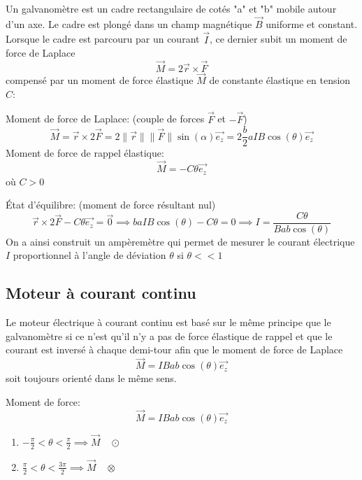 \documentclass[
    11pt,
    a4paper,
    oneside,
    headinlcude, footinclude,
    twoside,
]{report}
\renewcommand{\vec}[1]{\overrightarrow{#1}}
\begin{document}
Un galvanomètre est un cadre rectangulaire de cotés "a" et "b" mobile autour
d'un axe. Le cadre est plongé dans un champ magnétique $\vec B$ uniforme et
constant. Lorsque le cadre est parcouru par un courant $\vec I$, ce dernier
subit un moment de force de Laplace $$\vec M = 2 \vec r \times \vec F$$ 
compensé par un moment de force élastique $\vec M$ de constante élastique en
tension $C$:

\begin{center}
\end{center}

Moment de force de Laplace: (couple de forces $\vec F$ et $-\vec F$)
$$\vec M = \vec r \times 2 \vec F = 2 \| \vec r \| \|\vec F\| \sin(\alpha) \vec{e_{z}}
= 2 \frac{b}{2} a IB \cos(\theta) \vec{e_{z}}$$
Moment de force de rappel élastique:
$$\vec M = - C \theta \vec{e_{z}}$$
où $C > 0$

État d'équilibre: (moment de force résultant nul)
\begin{equation}
    \vec r \times 2 \vec F  - C \theta \vec{e_{z}} = \vec 0 \implies baIB \cos(\theta)
    - C\theta = 0 \implies I = \frac{C \theta}{ Bab \cos(\theta) }
\end{equation}
On a ainsi construit un ampèremètre qui permet de mesurer le courant électrique
$I$ proportionnel à l'angle de déviation $\theta$ si $\theta << 1$

\subsection{Moteur à courant continu}
\label{sub:moteur_a_courant_continu}

Le moteur électrique à courant continu est basé sur le même principe que le
galvanomètre si ce n'est qu'il n'y a pas de force élastique de rappel et que le
courant est inversé à chaque demi-tour afin que le moment de force de Laplace $$\vec M
= IBab \cos(\theta)\vec{e_{z}}$$ soit toujours orienté dans le même sens.


\begin{center}
    \begin{minipage}{.64\linewidth}
    \end{minipage}
    \begin{minipage}{.35\linewidth}
        \setlength{\parskip}{.3em}
        Moment de force:
        $$\vec M = IBab \cos(\theta)\vec{e_{z}}$$

        \begin{enumerate}
            \item $- \frac{\pi}{2} < \theta < \frac{\pi}{2} \implies \vec M
                \quad \odot$
            \item $ \frac{\pi}{2} < \theta < \frac{3\pi}{2} \implies \vec M
                \quad \otimes$
        \end{enumerate}
    \end{minipage}
\end{center}
\end{document}
